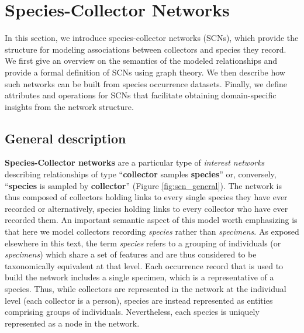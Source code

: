 {%

\section{Species-Collector Networks}

In this section, we introduce species-collector networks (SCNs), which provide the structure for modeling associations between collectors and species they record. 
We first give an overview on the semantics of the modeled relationships and provide a formal definition of SCNs using graph theory. We then describe how such networks can be built from species occurrence datasets.
Finally, we define attributes and operations for SCNs that facilitate obtaining domain-specific insights from the network structure.

\subsection{General description}
\textbf{Species-Collector networks} are a particular type of \textit{interest networks} describing relationships of type ``\textbf{collector} samples \textbf{species}'' or, conversely, ``\textbf{species} is sampled by \textbf{collector}'' (Figure \ref{fig:scn_general}). 
The network is thus composed of collectors holding links to every single species they have ever recorded or alternatively, species holding links to every collector who have ever recorded them.
An important semantic aspect of this model worth emphasizing is that here we model collectors recording \textit{species} rather than \textit{specimens}. 
As exposed elsewhere in this text, the term \textit{species} refers to a grouping of individuals (or \textit{specimens}) which share a set of features and are thus considered to be taxonomically equivalent at that level. %
Each occurrence record that is used to build the network includes a single specimen, which is a representative of a species.
Thus, while collectors are represented in the network at the individual level (each collector is a person), species are instead represented as entities comprising groups of individuals.
Nevertheless, each species is uniquely represented as a node in the network.

}
